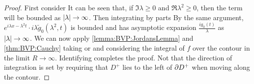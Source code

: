 \documentclass{article}
\begin{document}
\begin{proof}
First consider 
It can be seen that, if $\Im \lambda \geq 0$ and $\Re \lambda^2 \geq 0$, then the term will be bounded as $\left\lvert \lambda \right\rvert \to \infty$. Then integrating by parts
By the same argument, $e^{i\lambda x - \lambda^2 t} \cdot i\lambda\tilde{g}_0(\lambda^2,t)$ is bounded and has asymptotic expansion $\frac{ig_0(t)}{\lambda}$ as $\left\lvert \lambda \right\rvert\to\infty$. We can now apply \ref{lemma:BVP:JordansLemma} and \ref{thm:BVP:Cauchy} taking 
or 
and considering the integral of $f$ over the contour 
in the limit $R \to \infty$. Identifying 
completes the proof. Not that the direction of integration is set by requiring that $D^+$ lies to the left of $\partial D^+$ when moving along the contour. 
\end{proof}
\end{document}
